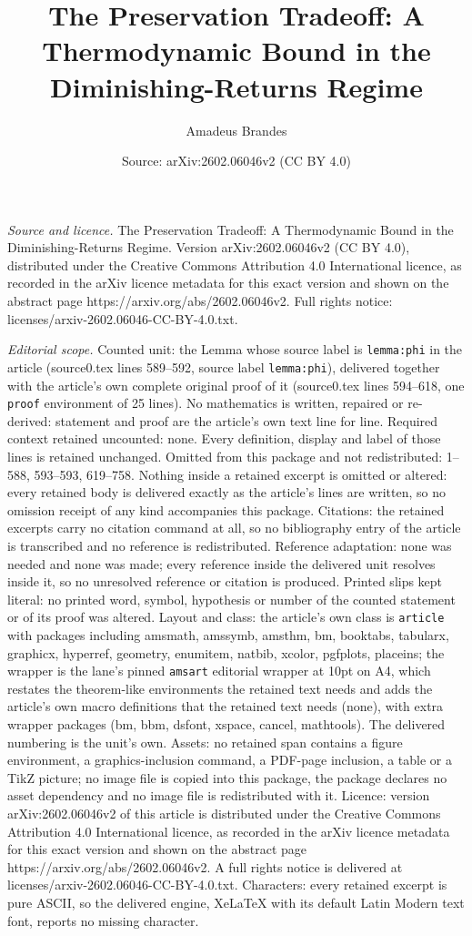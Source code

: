 \documentclass[10pt,a4paper]{amsart}
\title[The Preservation Tradeoff: A Thermodynamic Bound in the Dimi]{The Preservation Tradeoff: A Thermodynamic Bound in the Diminishing-Returns Regime}
\author{Amadeus Brandes}
\date{Source: arXiv:2602.06046v2 (CC BY 4.0)}
\begin{document}
\maketitle

\noindent\emph{Source and licence.} The Preservation Tradeoff: A Thermodynamic Bound in the Diminishing-Returns Regime. Version arXiv:2602.06046v2 (CC BY 4.0), distributed under the Creative Commons Attribution 4.0 International licence, as recorded in the arXiv licence metadata for this exact version and shown on the abstract page https://arxiv.org/abs/2602.06046v2. Full rights notice: licenses/arxiv-2602.06046-CC-BY-4.0.txt.\par\smallskip

\noindent\textit{Editorial scope.} Counted unit: the Lemma whose source label is \texttt{lemma:phi} in the article (source0.tex lines 589--592, source label \texttt{lemma:phi}), delivered together with the article's own complete original proof of it (source0.tex lines 594--618, one \texttt{proof} environment of 25 lines). No mathematics is written, repaired or re-derived: statement and proof are the article's own text line for line. Required context retained uncounted: none. Every definition, display and label of those lines is retained unchanged. Omitted from this package and not redistributed: 1--588, 593--593, 619--758. Nothing inside a retained excerpt is omitted or altered: every retained body is delivered exactly as the article's lines are written, so no omission receipt of any kind accompanies this package. Citations: the retained excerpts carry no citation command at all, so no bibliography entry of the article is transcribed and no reference is redistributed. Reference adaptation: none was needed and none was made; every reference inside the delivered unit resolves inside it, so no unresolved reference or citation is produced. Printed slips kept literal: no printed word, symbol, hypothesis or number of the counted statement or of its proof was altered. Layout and class: the article's own class is \texttt{article} with packages including amsmath, amssymb, amsthm, bm, booktabs, tabularx, graphicx, hyperref, geometry, enumitem, natbib, xcolor, pgfplots, placeins; the wrapper is the lane's pinned \texttt{amsart} editorial wrapper at 10pt on A4, which restates the theorem-like environments the retained text needs and adds the article's own macro definitions that the retained text needs (none), with extra wrapper packages (bm, bbm, dsfont, xspace, cancel, mathtools). The delivered numbering is the unit's own. Assets: no retained span contains a figure environment, a graphics-inclusion command, a PDF-page inclusion, a table or a TikZ picture; no image file is copied into this package, the package declares no asset dependency and no image file is redistributed with it. Licence: version arXiv:2602.06046v2 of this article is distributed under the Creative Commons Attribution 4.0 International licence, as recorded in the arXiv licence metadata for this exact version and shown on the abstract page https://arxiv.org/abs/2602.06046v2. A full rights notice is delivered at licenses/arxiv-2602.06046-CC-BY-4.0.txt. Characters: every retained excerpt is pure ASCII, so the delivered engine, XeLaTeX with its default Latin Modern text font, reports no missing character.
\end{document}
